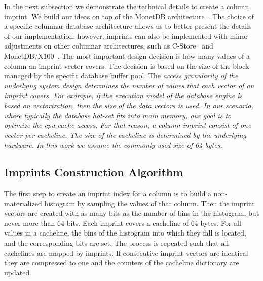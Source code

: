 In the next subsection we demonstrate the technical details to create a column
imprint. We build our ideas on top of the MonetDB architecture~\cite{MonetDB}.
The choice of a specific columnar database architecture allows us to better
present the details of our implementation, however, imprints can also be
implemented with minor adjustments on other columnar architectures, such as
C-Store~\cite{SAB+05} and MonetDB/X100~\cite{BZN05}. The most important design
decision is how many values of a column an imprint vector covers. The decision
is based on the size of the block managed by the specific database buffer pool.
The \it{access granularity} of the underlying system design determines the
number of values that each vector of an imprint covers. For example, if the
execution model of the database engine is based on vectorization, then the size
of the data vectors is used. In our scenario, where typically the database
hot-set fits into main memory, our goal is to optimize the cpu cache access.
For that reason, a column imprint consist of one vector per cacheline. The size
of the cacheline is determined by the underlying hardware. In this work we
assume the commonly used size of 64 bytes.

\subsection{Imprints Construction Algorithm}

The first step to create an imprint index for a column is to build a
non-materialized histogram by sampling the values of that column. Then the
imprint vectors are created with as many bits as the number of bins in
the histogram, but never more than 64 bits. Each imprint covers a cacheline of
64 bytes. For all values in a cacheline, the bins of the histogram into which
they fall is located, and the corresponding bits are set. The process is
repeated such that all cachelines are mapped by imprints. If consecutive
imprint vectors are identical they are compressed to one and the counters of
the cacheline dictionary are updated.

